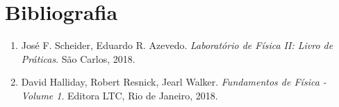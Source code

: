 \newpage
\section{Bibliografia}

\begin{enumerate}
  \item José F. Scheider, Eduardo R. Azevedo. \textit{Laboratório de Física II: Livro de Práticas}. São Carlos, 2018.
  \item David Halliday, Robert Resnick, Jearl Walker. \textit{Fundamentos de Física - Volume 1}. Editora LTC, Rio de Janeiro, 2018.
\end{enumerate}

%
